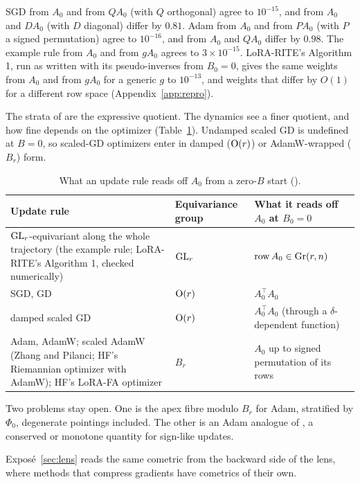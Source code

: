 \noindent{}\enspace SGD from $A_0$ and from $QA_0$ (with $Q$ orthogonal) agree to $10^{-15}$, and from $A_0$
and $DA_0$ (with $D$ diagonal) differ by $0.81$. Adam from $A_0$ and from $PA_0$ (with $P$ a signed
permutation) agree to $10^{-16}$, and from $A_0$ and $QA_0$ differ by $0.98$. The example rule from $A_0$ and from
$gA_0$ agrees to $3\times10^{-15}$. LoRA-RITE's Algorithm 1, run as written with its pseudo-inverses from $B_0=0$, gives
the same weights from $A_0$ and from $gA_0$ for a generic $g$ to $10^{-13}$, and weights that differ by $O(1)$ for a
different row space (Appendix~\ref{app:repro}).

\begin{explains}
The strata of  are the expressive quotient. The dynamics see a finer quotient, and how fine depends
on the optimizer (Table~\ref{tab:zero-b}). Undamped scaled GD is undefined at $B=0$, so scaled-GD optimizers enter in
damped ($\mathrm{O}(r)$) or AdamW-wrapped ($B_r$) form.
\end{explains}

\begin{table}[t]
\centering
\caption{What an update rule reads off $A_0$ from a zero-$B$ start ().}
\label{tab:zero-b}
\small
\begin{tabularx}{\linewidth}{>{\raggedright\arraybackslash}X l >{\raggedright\arraybackslash}p{4.6cm}}
\toprule
\headrow \textbf{Update rule} & \textbf{Equivariance group} & \textbf{What it reads off $A_0$ at $B_0=0$}\\
\midrule
$\mathrm{GL}_r$-equivariant along the whole trajectory (the example rule; LoRA-RITE's Algorithm 1, checked numerically) & $\mathrm{GL}_r$ & $\operatorname{row}A_0\in\operatorname{Gr}(r,n)$\\
SGD, GD & $\mathrm{O}(r)$ & $A_0^\top A_0$\\
damped scaled GD & $\mathrm{O}(r)$ & $A_0^\top A_0$ (through a $\delta$-dependent function)\\
Adam, AdamW; scaled AdamW (Zhang and Pilanci; HF's Riemannian optimizer with AdamW); HF's LoRA-FA optimizer & $B_r$ & $A_0$ up to signed permutation of its rows\\
\bottomrule
\end{tabularx}
\end{table}

Two problems stay open. One is the apex fibre modulo $B_r$ for Adam, stratified by $\Phi_0$, degenerate pointings
included. The other is an Adam analogue of , a conserved or monotone quantity for sign-like
updates.

Exposé~\ref{sec:lens} reads the same cometric from the backward side of the lens, where methods that compress gradients
have cometrics of their own.
